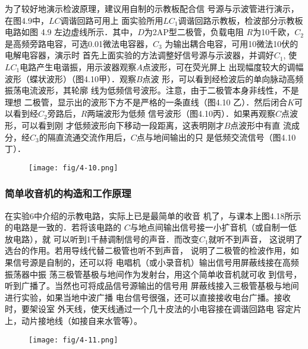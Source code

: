 为了较好地演示检波原理，建议用自制的示教板配合信
号源与示波管进行演示，在图4.9中，$LC$调谐回路可用上
面实验所用$LC_1$调谐回路示教板，检波部分示教板电路如图
4.9 左边虚线所示．其中，$D$为2AP型二极管，负载电阻
$R$为10千欧，$C_2$是高频旁路电容，可选0.01微法电容器，$C_3$
为输出耦合电容，可用10微法10伏的电解电容器，演示时
首先上面实验的方法调整好信号源与示波器，并调好$C_1$, 使
$LC_1$电路产生电谐振，用示波器观察$A$点波形，可在荧光屏上
出现幅度较大的调幅波形（蝶状波形）（图4.10甲）．观察$B$点波
形，可以看到经检波后的单向脉动高频振荡电流波形，其轮廓
线为低频信号波形。注意，由于二极管本身非线性，不是理想
二极管，显示出的波形下方不是严格的一条直线（图4.10
乙）．然后闭合$K$可以看到经$C_2$旁路后，$R$两端波形为低频
信号波形（图4.10丙）．如果再观察$C$点波形，可以看到刚
才低频波形向下移动一段距离，这表明刚才$B$点波形中有直
流成分，经$C_3$的隔直流通交流作用后，$C$点与地间输出的只
是低频交流信号（图4.10丁）．

\begin{figure}[htp]
    \centering
\texttt{[image: fig/4-10.png]}
    \caption{}
\end{figure}

\subsubsection{简单收音机的构造和工作原理}
在实验6中介绍的示教电路，实际上已是最简单的收音
机了，与课本上图4.18所示的电路是一致的．若将该电路的
$C$与地点间输出信号接一小扩音机（或自制一低放电路），就
可以听到1千赫调制信号的声音．而改变$C_1$就听不到声音，
这说明了选台的作用。若用导线代替二极管也听不到声音，
说明了二极管的检波作用，如果信号源是自制的，还可以将
电唱机（或小录音机）输出信号用屏蔽线接在高频振荡器中振
荡三极管基极与地间作为发射台，用这个简单收音机就可收
到信号，听到广播了。当然也可将成品信号源输出的信号用
屏蔽线接入三极管基极与地间进行实验，如果当地中波广播
电台信号很强，还可以直接接收电台广播。接收时，要架设室
外天线，使天线通过一个几十皮法的小电容接在调谐回路电
容定片上，动片接地线（如接自来水管等）。

\begin{figure}[htp]
    \centering
\texttt{[image: fig/4-11.png]}
    \caption{}
\end{figure}

